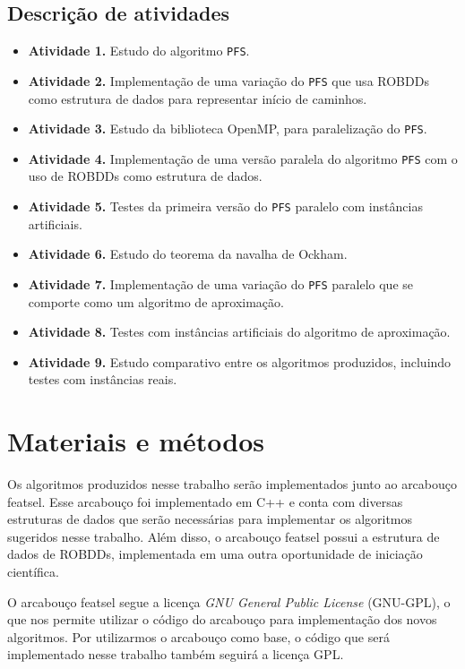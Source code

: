 \documentclass[12pt]{article}
\begin{document}
\subsection{Descrição de atividades}
\begin{itemize}
    \item{\bf Atividade 1.}
        Estudo do algoritmo {\tt PFS}.
    \item{\bf Atividade 2.}
        Implementação de uma variação do {\tt PFS} que usa ROBDDs como 
        estrutura de dados para representar início de caminhos.
    \item{\bf Atividade 3.}
        Estudo da biblioteca OpenMP, para paralelização do {\tt PFS}.
    \item{\bf Atividade 4.}
        Implementação de uma versão paralela do algoritmo {\tt PFS} com
        o uso de ROBDDs como estrutura de dados.
    \item{\bf Atividade 5.}
        Testes da primeira versão do {\tt PFS} paralelo com instâncias
        artificiais.
    \item{\bf Atividade 6.}
        Estudo do teorema da navalha de Ockham.
    \item{\bf Atividade 7.} 
        Implementação de uma variação do {\tt PFS} paralelo que se 
        comporte como um algoritmo de aproximação.
    \item{\bf Atividade 8.}
        Testes com instâncias artificiais do algoritmo de aproximação.
    \item{\bf Atividade 9.}
        Estudo comparativo entre os algoritmos produzidos, incluindo
        testes com instâncias reais.
\end{itemize}


\section{Materiais e métodos}
Os algoritmos produzidos nesse trabalho serão implementados junto ao 
arcabouço featsel. Esse arcabouço foi implementado em C++ e conta com
diversas estruturas de dados que serão necessárias para implementar os
algoritmos sugeridos nesse trabalho. Além disso, o arcabouço featsel 
possui a estrutura de dados de ROBDDs, implementada em uma outra 
oportunidade de iniciação científica. 

O arcabouço featsel segue a licença \textit{GNU General Public License}
(GNU-GPL), o que nos permite utilizar o código do arcabouço para 
implementação dos novos algoritmos. Por utilizarmos o arcabouço como 
base, o código que será implementado nesse trabalho também seguirá a
licença GPL.
\end{document}
